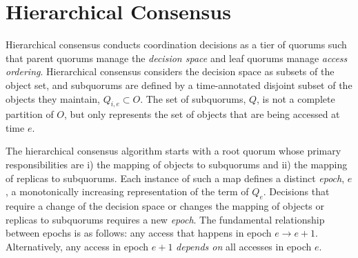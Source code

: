 \documentclass[11pt,letterpaper]{article}
\begin{document}


\section{Hierarchical Consensus}
\vspace{-.5em}

Hierarchical consensus conducts coordination decisions as a tier of quorums such that
parent quorums manage the \emph{decision space} and leaf quorums manage \emph{access ordering}.
Hierarchical consensus considers the decision space as subsets of the object set, and
subquorums are defined by a time-annotated disjoint subset of the objects they maintain,
$Q_{i,e} \subset O$.
The set of subquorums, $Q$, is not a complete partition of $O$, but only represents the set of
objects that are being accessed at time $e$.


The hierarchical consensus algorithm starts with a root quorum whose primary
responsibilities are i) the mapping of objects to subquorums and ii) the
mapping of replicas to subquorums.
Each instance of such a map defines a distinct \emph{epoch}, $e$, a
monotonically increasing representation of the term of $Q_e$.
Decisions that require a change of the decision space or changes the
mapping of objects or replicas to subquorums requires a new \emph{epoch}.
The fundamental relationship between epochs is as follows: any access that
happens in epoch $e \rightarrow e+1$.
Alternatively, any access in epoch $e+1$ \emph{depends on} all accesses in
epoch $e$.
\end{document}
